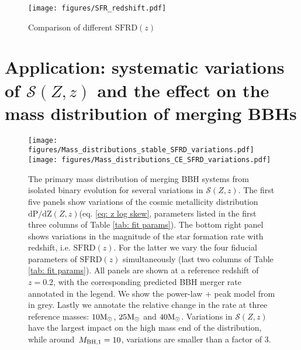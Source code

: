 \documentclass[twocolumn]{aastex631}
\newcommand{\Msun}{\ensuremath{\rm{M}_{\odot}}\xspace}
\newcommand{\Mbheen}{\ensuremath{\,M_{\rm BH, 1}}\xspace}
\newcommand{\SFRDzZ}{\ensuremath{\mathcal{S}(Z,z)}\xspace}
\newcommand{\SFRDz}{\ensuremath{\mathrm{SFRD}(z)}\xspace}
\newcommand{\dpdZ}{\ensuremath{\mathrm{dP/dZ}(Z,z)}\xspace}
\begin{document}


\begin{figure}
\centering
{}
\texttt{[image: figures/SFR\_redshift.pdf]}
\caption{Comparison of different \SFRDz
 \label{fig: SFR(z)}}
\end{figure}



\section{Application: systematic variations of \SFRDzZ and the effect on the mass distribution of merging BBHs \label{sec: mass dists}}


\begin{figure*}
\centering
{}
\texttt{[image: figures/Mass\_distributions\_stable\_SFRD\_variations.pdf]}
\texttt{[image: figures/Mass\_distributions\_CE\_SFRD\_variations.pdf]}
\caption{The primary mass distribution of merging BBH systems from isolated binary evolution for several variations in \SFRDzZ. 
The first five panels show variations of the cosmic metallicity distribution  \dpdZ (eq. \ref{eq: z log skew}, parameters listed in the first three columns of Table \ref{tab: fit params}). The bottom right panel shows variations in the magnitude of the star formation rate with redshift, i.e. \SFRDz. For the latter we vary the four fiducial parameters of \SFRDz simultaneously (last two columns of Table \ref{tab: fit params}). All panels are shown at a reference redshift of $z=0.2$, with the corresponding predicted BBH merger rate annotated in the legend. We show the power-law + peak model from \protect\cite{GWTC3_popPaper2021} in grey. Lastly we annotate the relative change in the rate at three reference masses: $10\Msun$, $25\Msun$ and $40\Msun$. Variations in \SFRDzZ have the largest impact on the high mass end of the distribution, while around $\Mbheen=10$, variations are smaller than a factor of 3.  
  \label{fig: mass dists}}
\end{figure*}
\end{document}
